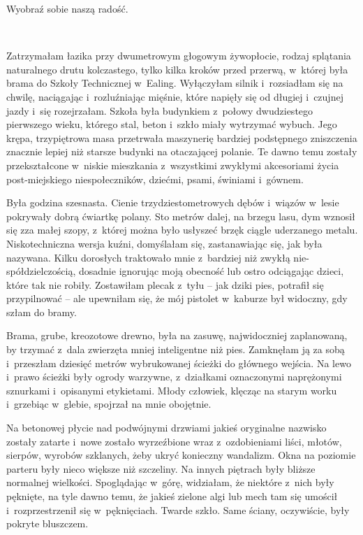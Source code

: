 \documentclass[oneside,polish,11pt,sfheadings]{mwbk}
\begin{document}
Wyobraź sobie naszą radość.

~

Zatrzymałam łazika przy dwumetrowym głogowym żywopłocie, rodzaj
splątania naturalnego drutu kolczastego, tylko kilka kroków przed
przerwą, w~której była brama do Szkoły Technicznej w~Ealing. Wyłączyłam
silnik i~rozsiadłam się na chwilę, naciągając i~rozluźniając mięśnie,
które napięły się od długiej i~czujnej jazdy i~się rozejrzałam. Szkoła
była budynkiem z~połowy dwudziestego pierwszego wieku, którego stal,
beton i~szkło miały wytrzymać wybuch. Jego krępa, trzypiętrowa masa
przetrwała maszynerię bardziej podstępnego zniszczenia znacznie lepiej
niż starsze budynki na otaczającej polanie. Te dawno temu zostały
przekształcone w~niskie mieszkania z~wszystkimi zwykłymi akcesoriami
życia post-miejskiego niespołeczników, dziećmi, psami, świniami i~gównem.

Była godzina szesnasta. Cienie trzydziestometrowych dębów i~wiązów w~lesie pokrywały dobrą ćwiartkę polany. Sto metrów dalej, na brzegu lasu,
dym wznosił się zza małej szopy, z~której można było usłyszeć brzęk
ciągle uderzanego metalu. Niskotechniczna wersja kuźni, domyślałam się,
zastanawiając się, jak była nazywana. Kilku dorosłych traktowało mnie z~bardziej niż zwykłą nie-spółdzielczością, dosadnie ignorując moją
obecność lub ostro odciągając dzieci, które tak nie robiły. Zostawiłam
plecak z~tyłu -- jak dziki pies, potrafił się przypilnować -- ale
upewniłam się, że mój pistolet w~kaburze był widoczny, gdy szłam do
bramy.

Brama, grube, kreozotowe drewno, była na zasuwę, najwidoczniej
zaplanowaną, by trzymać z~dala zwierzęta mniej inteligentne niż pies.
Zamknęłam ją za sobą i~przeszłam dziesięć metrów wybrukowanej ścieżki do
głównego wejścia. Na lewo i~prawo ścieżki były ogrody warzywne, z~działkami oznaczonymi naprężonymi sznurkami i~opisanymi etykietami.
Młody człowiek, klęcząc na starym worku i~grzebiąc w~glebie, spojrzał na
mnie obojętnie.

Na betonowej płycie nad podwójnymi drzwiami jakieś oryginalne nazwisko
zostały zatarte i~nowe zostało wyrzeźbione wraz z~ozdobieniami liści,
młotów, sierpów, wyrobów szklanych, żeby ukryć konieczny wandalizm. Okna
na poziomie parteru były nieco większe niż szczeliny. Na innych piętrach
były bliższe normalnej wielkości. Spoglądając w~górę, widziałam, że
niektóre z~nich były pęknięte, na tyle dawno temu, że jakieś zielone
algi lub mech tam się umościł i~rozprzestrzenił się w~pęknięciach.
Twarde szkło. Same ściany, oczywiście, były pokryte bluszczem.
\end{document}
